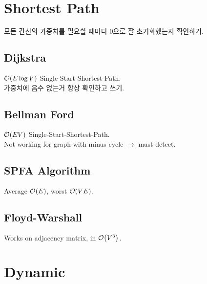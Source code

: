 \documentclass[landscape,8pt]{article}
\begin{document}
\begin{multicols}{2}



\section{Shortest Path}
  모든 간선의 가중치를 필요할 때마다 0으로 잘 초기화했는지 확인하기.
  \subsection{Dijkstra}
    $\order{E \log V}$ Single-Start-Shortest-Path.\\
    가중치에 음수 없는거 항상 확인하고 쓰기.
      

  \subsection{Bellman Ford}
    $\order{EV}$ Single-Start-Shortest-Path.\\
    Not working for graph with minus cycle $\rightarrow$ must detect.
      

  \subsection{SPFA Algorithm}
    Average $\order{E}$, worst $\order{VE}$.
    

  \subsection{Floyd-Warshall}
    Works on adjacency matrix, in $\order{V^3}$.
      


\section{Dynamic}

\end{multicols}
\end{document}
